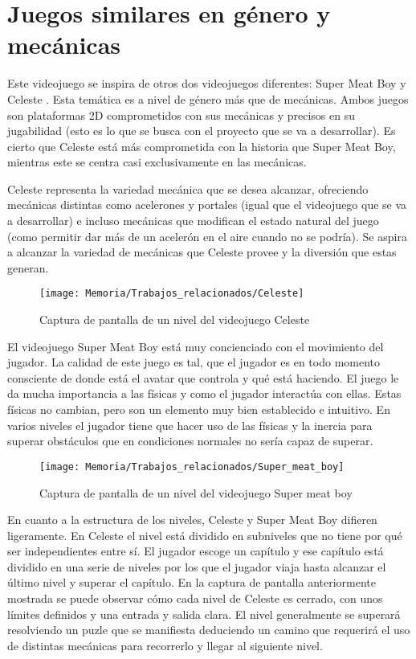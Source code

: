
\section{Juegos similares en género y mecánicas}
Este videojuego se inspira de otros dos videojuegos diferentes: Super Meat Boy \cite{SuperMeatBoy} y Celeste \cite{Celeste}. Esta temática es a nivel de género más que de mecánicas. Ambos juegos son plataformas 2D comprometidos con sus mecánicas y precisos en su jugabilidad (esto es lo que se busca con el proyecto que se va a desarrollar). Es cierto que Celeste está más comprometida con la historia que Super Meat Boy, mientras este se centra casi exclusivamente en las mecánicas.

Celeste representa la variedad mecánica que se desea alcanzar, ofreciendo mecánicas distintas como acelerones y portales (igual que el videojuego que se va a desarrollar) e incluso mecánicas que modifican el estado natural del juego (como permitir dar más de un acelerón en el aire cuando no se podría). Se aspira a alcanzar la variedad de mecánicas que Celeste provee y la diversión que estas generan.

\begin{figure}[h]
\centering
\texttt{[image: Memoria/Trabajos\_relacionados/Celeste]}
\caption{Captura de pantalla de un nivel del videojuego Celeste}
\end{figure}
\clearpage

El videojuego Super Meat Boy está muy concienciado con el movimiento del jugador. La calidad de este juego es tal, que el jugador es en todo momento consciente de donde está el avatar que controla y qué está haciendo. El juego le da mucha importancia a las físicas y como el jugador interactúa con ellas. Estas físicas no cambian, pero son un elemento muy bien establecido e intuitivo. En varios niveles el jugador tiene que hacer uso de las físicas y la inercia para superar obstáculos que en condiciones normales no sería capaz de superar.

\begin{figure}[h]
\centering
\texttt{[image: Memoria/Trabajos\_relacionados/Super\_meat\_boy]}
\caption{Captura de pantalla de un nivel del videojuego Super meat boy}
\end{figure}

En cuanto a la estructura de los niveles, Celeste y Super Meat Boy difieren ligeramente. En Celeste el nivel está dividido en subniveles que no tiene por qué ser independientes entre sí. El jugador escoge un capítulo y ese capítulo está dividido en una serie de niveles por los que el jugador viaja hasta alcanzar el último nivel y superar el capítulo. En la captura de pantalla anteriormente mostrada se puede observar cómo cada nivel de Celeste es cerrado, con unos límites definidos y una entrada y salida clara. El nivel generalmente se superará resolviendo un puzle que se manifiesta deduciendo un camino que requerirá el uso de distintas mecánicas para recorrerlo y llegar al siguiente nivel.


